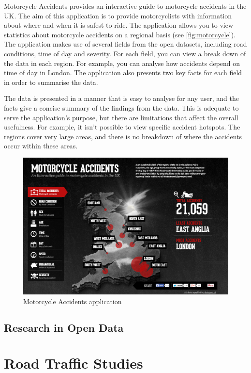 \documentclass[authoryearcitations]{UoYCSproject}
\begin{document}
Motorcycle Accidents \citep{Mceinsurance} provides an interactive guide to motorcycle accidents in the UK. The aim of this application is to provide motorcyclists with information about where and when it is safest to ride. The application allows you to view statistics about motorcycle accidents on a regional basis (see \autoref{fig:motorcycle}). The application makes use of several fields from the open datasets, including road conditions, time of day and severity. For each field, you can view a break down of the data in each region. For example, you can analyse how accidents depend on time of day in London. The application also presents two key facts for each field in order to summarise the data.

The data is presented in a manner that is easy to analyse for any user, and the facts give a concise summary of the findings from the data. This is adequate to serve the application's purpose, but there are limitations that affect the overall usefulness. For example, it isn't possible to view specific accident hotspots. The regions cover very large areas, and there is no breakdown of where the accidents occur within these areas.

\begin{figure}
	\includegraphics[scale=0.3]{motorcycle}
	\caption{Motorcycle Accidents application}
	\label{fig:motorcycle}
\end{figure}

\subsection{Research in Open Data}

\section{Road Traffic Studies}
\end{document}
